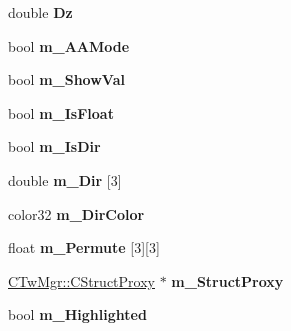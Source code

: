 \begin{DoxyCompactItemize}
\item 
\hypertarget{struct_c_quaternion_ext_a7163c59964d99af43021f7e0a9069cbe}{double {\bfseries Dz}}\label{struct_c_quaternion_ext_a7163c59964d99af43021f7e0a9069cbe}

\item 
\hypertarget{struct_c_quaternion_ext_ad84c621225aceecc9252541e598e4b80}{bool {\bfseries m\+\_\+\+A\+A\+Mode}}\label{struct_c_quaternion_ext_ad84c621225aceecc9252541e598e4b80}

\item 
\hypertarget{struct_c_quaternion_ext_a8c65341b4d1999a77d530b82e1d75172}{bool {\bfseries m\+\_\+\+Show\+Val}}\label{struct_c_quaternion_ext_a8c65341b4d1999a77d530b82e1d75172}

\item 
\hypertarget{struct_c_quaternion_ext_a972408bca95fef05c106bbce1650afdf}{bool {\bfseries m\+\_\+\+Is\+Float}}\label{struct_c_quaternion_ext_a972408bca95fef05c106bbce1650afdf}

\item 
\hypertarget{struct_c_quaternion_ext_aaee74ed43227a94f83fd063ce12636fb}{bool {\bfseries m\+\_\+\+Is\+Dir}}\label{struct_c_quaternion_ext_aaee74ed43227a94f83fd063ce12636fb}

\item 
\hypertarget{struct_c_quaternion_ext_aa939b9fc587c7bd973e554a42bbf06c9}{double {\bfseries m\+\_\+\+Dir} \mbox{[}3\mbox{]}}\label{struct_c_quaternion_ext_aa939b9fc587c7bd973e554a42bbf06c9}

\item 
\hypertarget{struct_c_quaternion_ext_a83ec20e9218f0eae2c09f360237df860}{color32 {\bfseries m\+\_\+\+Dir\+Color}}\label{struct_c_quaternion_ext_a83ec20e9218f0eae2c09f360237df860}

\item 
\hypertarget{struct_c_quaternion_ext_ab2f4ea50d3d0e16342e4fbbf0385c16f}{float {\bfseries m\+\_\+\+Permute} \mbox{[}3\mbox{]}\mbox{[}3\mbox{]}}\label{struct_c_quaternion_ext_ab2f4ea50d3d0e16342e4fbbf0385c16f}

\item 
\hypertarget{struct_c_quaternion_ext_a7b65ff8f23a42c9cfc36a63073bb62f0}{\hyperlink{struct_c_tw_mgr_1_1_c_struct_proxy}{C\+Tw\+Mgr\+::\+C\+Struct\+Proxy} $\ast$ {\bfseries m\+\_\+\+Struct\+Proxy}}\label{struct_c_quaternion_ext_a7b65ff8f23a42c9cfc36a63073bb62f0}

\item 
\hypertarget{struct_c_quaternion_ext_a206120179e00b571721d5121bf10ced2}{bool {\bfseries m\+\_\+\+Highlighted}}\label{struct_c_quaternion_ext_a206120179e00b571721d5121bf10ced2}


\end{DoxyCompactItemize}
